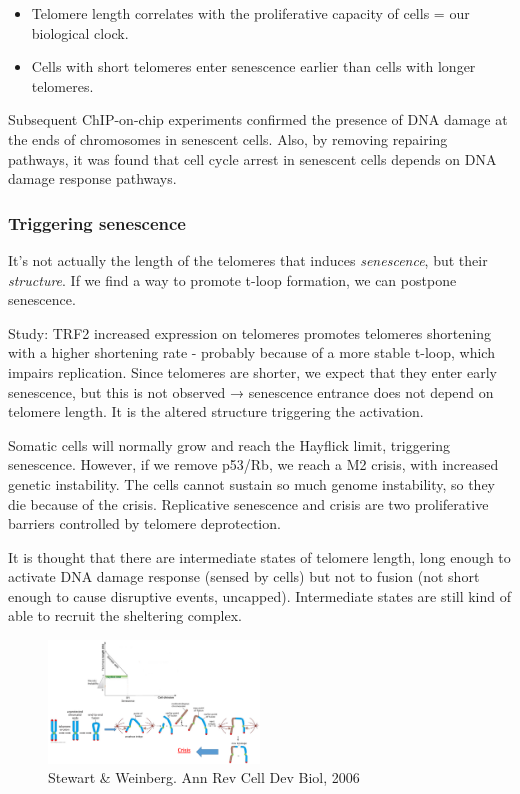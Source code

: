 \begin{itemize}
\tightlist
\item
  Telomere length correlates with the proliferative capacity of cells =
  our biological clock.
\item
  Cells with short telomeres enter senescence earlier than cells with
  longer telomeres.
\end{itemize}

Subsequent ChIP-on-chip experiments confirmed the presence of DNA damage
at the ends of chromosomes in senescent cells. Also, by removing
repairing pathways, it was found that cell cycle arrest in senescent
cells depends on DNA damage response pathways.

\hypertarget{triggering-senescence}{%
\subsubsection{Triggering senescence}\label{triggering-senescence}}

It's not actually the length of the telomeres that induces
\emph{senescence}, but their \emph{structure}. If we find a way to
promote t-loop formation, we can postpone senescence.

Study: TRF2 increased expression on telomeres promotes telomeres
shortening with a higher shortening rate - probably because of a more
stable t-loop, which impairs replication. Since telomeres are shorter,
we expect that they enter early senescence, but this is not observed →
senescence entrance does not depend on telomere length. It is the
altered structure triggering the activation.

Somatic cells will normally grow and reach the Hayflick limit,
triggering senescence. However, if we remove p53/Rb, we reach a M2
crisis, with increased genetic instability. The cells cannot sustain so
much genome instability, so they die because of the crisis. Replicative
senescence and crisis are two proliferative barriers controlled by
telomere deprotection.

It is thought that there are intermediate states of telomere length,
long enough to activate DNA damage response (sensed by cells) but not to
fusion (not short enough to cause disruptive events, uncapped).
Intermediate states are still kind of able to recruit the sheltering
complex.

\begin{figure}
\centering
\includegraphics[width=0.5\textwidth]{../_resources/Screen_Shot_2022-12-15_at_22-39-00.png}
\caption{Stewart \& Weinberg. Ann Rev Cell Dev Biol, 2006}
\end{figure}

